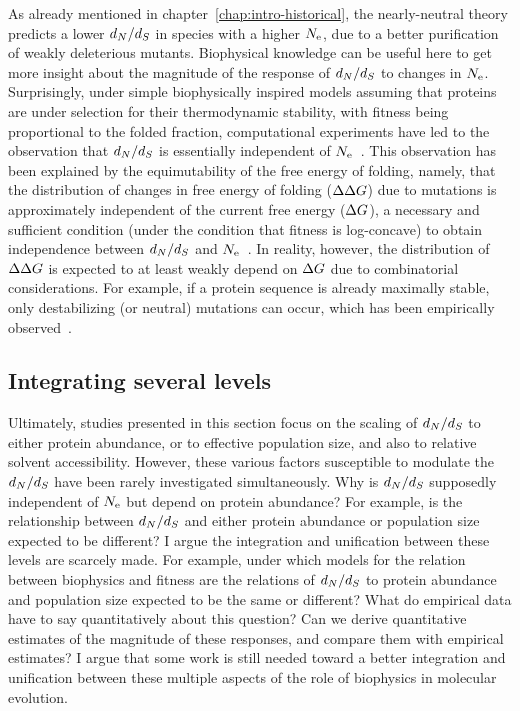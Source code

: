As already mentioned in chapter~\ref{chap:intro-historical}, the \gls{nearly-neutral} theory predicts a lower $d_N / d_S$ in species with a higher $N_{\text{e}}$, due to a better purification of weakly deleterious mutants.
Biophysical knowledge can be useful here to get more insight about the magnitude of the response of $d_N / d_S$ to changes in $N_{\text{e}}$.
Surprisingly, under simple biophysically inspired models assuming that proteins are under selection for their thermodynamic stability, with fitness being proportional to the folded fraction, computational experiments have led to the observation that $d_N / d_S$ is essentially independent of $N_{\text{e}}$~\citep{Goldstein2013}.
This observation has been explained by the equimutability of the free energy of folding, namely, that the distribution of changes in free energy of folding ($\Delta \Delta G$) due to mutations is approximately independent of the current free energy ($\Delta G$), a necessary and sufficient condition (under the condition that fitness is log-concave) to obtain independence between $d_N / d_S$ and $N_{\text{e}}$~\citep{Cherry1998}.
In reality, however, the distribution of $\Delta \Delta G$ is expected to at least weakly depend on $\Delta G$ due to combinatorial considerations.
For example, if a protein sequence is already maximally stable, only destabilizing (or neutral) mutations can occur, which has been empirically observed~\citep{Serohijos2012}.

\subsection{Integrating several levels}

Ultimately, studies presented in this section focus on the scaling of $d_N / d_S$ to either protein abundance, or to \gls{effective population size}, and also to relative solvent accessibility.
However, these various factors susceptible to modulate the $d_N / d_S$ have been rarely investigated simultaneously.
Why is $d_N / d_S$ supposedly independent of $N_{\text{e}}$ but depend on protein abundance?
For example, is the relationship between $d_N / d_S$ and either protein abundance or population size expected to be different?
I argue the integration and unification between these levels are scarcely made.
For example, under which models for the relation between biophysics and fitness are the relations of $d_N / d_S$ to protein abundance and population size expected to be the same or different?
What do empirical data have to say quantitatively about this question?
Can we derive quantitative estimates of the magnitude of these responses, and compare them with empirical estimates?
I argue that some work is still needed toward a better integration and unification between these multiple aspects of the role of biophysics in molecular evolution.

